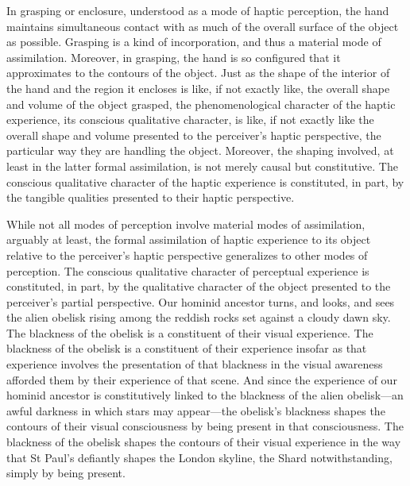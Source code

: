 In grasping or enclosure, understood as a mode of haptic perception, the hand maintains simultaneous contact with as much of the overall surface of the object as possible. Grasping is a kind of incorporation, and thus a material mode of assimilation. Moreover, in grasping, the hand is so configured that it approximates to the contours of the object. Just as the shape of the interior of the hand and the region it encloses is like, if not exactly like, the overall shape and volume of the object grasped, the phenomenological character of the haptic experience, its conscious qualitative character, is like, if not exactly like the overall shape and volume presented to the perceiver's haptic perspective, the particular way they are handling the object. Moreover, the shaping involved, at least in the latter formal assimilation, is not merely causal but constitutive. The conscious qualitative character of the haptic experience is constituted, in part, by the tangible qualities presented to their haptic perspective.

While not all modes of perception involve material modes of assimilation, arguably at least, the formal assimilation of haptic experience to its object relative to the perceiver's haptic perspective generalizes to other modes of perception. The conscious qualitative character of perceptual experience is constituted, in part, by the qualitative character of the object presented to the perceiver's partial perspective. Our hominid ancestor turns, and looks, and sees the alien obelisk rising among the reddish rocks set against a cloudy dawn sky. The blackness of the obelisk is a constituent of their visual experience. The blackness of the obelisk is a constituent of their experience insofar as that experience involves the presentation of that blackness in the visual awareness afforded them by their experience of that scene. And since the experience of our hominid ancestor is constitutively linked to the blackness of the alien obelisk---an awful darkness in which stars may appear---the obelisk’s blackness shapes the contours of their visual consciousness by being present in that consciousness. The blackness of the obelisk shapes the contours of their visual experience in the way that St Paul’s defiantly shapes the London skyline, the Shard notwithstanding, simply by being present. 

